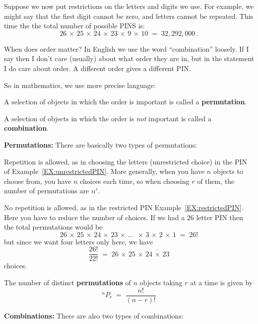 \begin{example}\label{EX:restrictedPIN}
Suppose we now put restrictions on the letters and digits we use. For example,
we might say that the first digit cannot be zero, and  letters cannot be
repeated.  This time the the total number of possible PINS is:
\[ 26\,\times\,25 \,\times\,24\,\times\,23\,\times\,9\,\times\,10 \;=\;32,292,000\,.\]
\end{example}

When does order matter? In English we use the word ``combination'' loosely. 
If I  say
 then I don't care (usually) about what order they are in,
but in the statement
I do care about order. A different order gives a different PIN.

So in mathematics, we use more precise language:
\bit
\item A selection of objects in which the order  is
  important is called a {\bf permutation}.

\item A selection of objects in which the order  is
  \emph{not}
  important is called a {\bf combination}.
\eit

{\bf Permutations:} There are basically two types of permutations:

\be
\item  Repetition is allowed, as in choosing the letters (unrestricted choice) in the PIN of Example~\ref{EX:unrestrictedPIN}. 
More generally, when you have $n$ objects to choose from, you have $n$ choices each time, so when choosing $r$ of them, the  number of permutations are $n^r$.
\item  No repetition is allowed, as in the restricted  PIN Example~\ref{EX:restrictedPIN}. Here you have to reduce the number of choices. 
If we had a 26 letter PIN then the total permutations would be
\[26\,\times\,25 \,\times\,24\,\times\,23\,\times\,\dots\;\,\times\,3
\,\times\,2 \,\times\, 1\;=\; 26!\]
but since we  want four letters only here,  we  have
\[\frac{26!}{22!}\;=\; 26\,\times\,25 \,\times\,24\,\times\,23\]
choices.
\ee

\begin{framed}The number of distinct {\bf permutations}  of $n$ objects taking
$r$ at a time is given by
\[^nP_r\;=\; \frac{n!}{(n-r)!}\]
\end{framed}

\bigskip

{\bf Combinations:} There are also two types of combinations:


